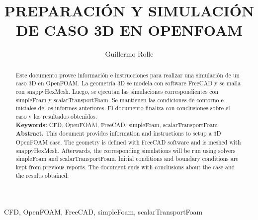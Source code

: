 \documentclass[oneside,a4paper,spanish,links]{amca}
\title{PREPARACIÓN Y SIMULACIÓN DE CASO 3D EN OPENFOAM}
\author[a]{Guillermo Rolle}
\begin{document}
\vspace{3cm}

\maketitle


\begin{keywords}
CFD, OpenFOAM, FreeCAD, simpleFoam, scalarTransportFoam
\end{keywords}

\begin{abstract}
Este documento provee información e instrucciones para realizar una simulación de un caso 3D en OpenFOAM.
La geometría 3D se modela con software FreeCAD y se malla con snappyHexMesh. Luego, se ejecutan las simulaciones correspondientes con simpleFoam y scalarTransportFoam.  Se mantienen las condiciones de contorno e iniciales de los informes anteriores. El documento finaliza con conclusiones sobre el caso y los resultados obtenidos. \\
%
\linebreak
%
\textbf{Keywords:} CFD, OpenFOAM, FreeCAD, simpleFoam, scalarTransportFoam\\
%
\linebreak
%
\textbf{Abstract.} This document provides information and
instructions to setup a 3D OpenFOAM case. The geometry is defined with FreeCAD software and is meshed with snappyHexMesh. Afterwards, the corresponding simulations will be run using solvers simpleFoam and scalarTransportFoam. Initial conditions and boundary conditions are kept from previous reports. The document ends with conclusions about the case and the results obtained.
\end{abstract}
\end{document}
